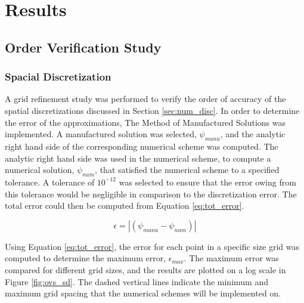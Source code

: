\chapter{Results}



\section{Order Verification Study}
\label{sec:ord_ver_std}

	\subsection{Spacial Discretization}
	\label{sec:s_disc}
A grid refinement study was performed to verify the order of accuracy of the spatial discretizations discussed in Section \ref{sec:num_disc}.  In order to determine the error of the approximations, The Method of Manufactured Solutions was implemented.  A manufactured solution was selected, $\psi_{manu}$, and the analytic right hand side of the corresponding numerical scheme was computed.  The analytic right hand side was used in the numerical scheme, to compute a numerical solution, $\psi_{num}$, that satisfied the numerical scheme to a specified tolerance.  A tolerance of $10^{-12}$ was selected to ensure that the error owing from this tolerance would be negligible in comparison to the discretization error.  The total error could then be computed from Equation \ref{eq:tot_error}.


\begin{equation}
\label{eq:tot_error}
\epsilon = |(\psi_{manu} - \psi_{num})|
\end{equation}


Using Equation \ref{eq:tot_error}, the error for each point in a specific size grid was computed to determine the maximum error, $\epsilon_{max}$.  The maximum error was compared for different grid sizes, and the results are plotted on a log scale in Figure \ref{fig:ovs_sd}.  The dashed vertical lines indicate the minimum and maximum grid spacing that the numerical schemes will be implemented on.


